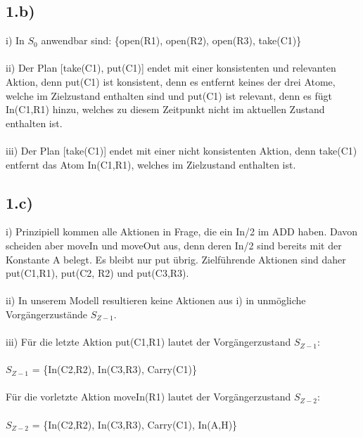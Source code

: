\documentclass[a4paper]{article}
\begin{document}
\subsection*{1.b)}
i) In $S_0$ anwendbar sind: \{open(R1), open(R2), open(R3), take(C1)\}\\
\\
ii) Der Plan [take(C1), put(C1)] endet mit einer konsistenten und relevanten Aktion, denn put(C1) ist konsistent, denn es entfernt keines der drei Atome, welche im Zielzustand enthalten sind und put(C1) ist relevant, denn es f\"ugt In(C1,R1) hinzu, welches zu diesem Zeitpunkt nicht im aktuellen Zustand enthalten ist.\\
\\
iii) Der Plan [take(C1)] endet mit einer nicht konsistenten Aktion, denn take(C1) entfernt das Atom In(C1,R1), welches im Zielzustand enthalten ist.

\subsection*{1.c)}
i) Prinzipiell kommen alle Aktionen in Frage, die ein In/2 im ADD haben. Davon scheiden aber moveIn und moveOut aus, denn deren In/2 sind bereits mit der Konstante A belegt. Es bleibt nur put \"ubrig. Zielf\"uhrende Aktionen sind daher put(C1,R1), put(C2, R2) und put(C3,R3).\\
\\
ii) In unserem Modell resultieren keine Aktionen aus i) in unm\"ogliche Vorg\"angerzust\"ande $S_{Z-1}$.\\
\\
iii) F\"ur die letzte Aktion put(C1,R1) lautet der Vorg\"angerzustand $S_{Z-1}$:\\
\\
$S_{Z-1}$ = \{In(C2,R2), In(C3,R3), Carry(C1)\}\\
\\
F\"ur die vorletzte Aktion moveIn(R1) lautet der Vorg\"angerzustand $S_{Z-2}$:\\
\\
$S_{Z-2}$ = \{In(C2,R2), In(C3,R3), Carry(C1), In(A,H)\}\\
\end{document}
